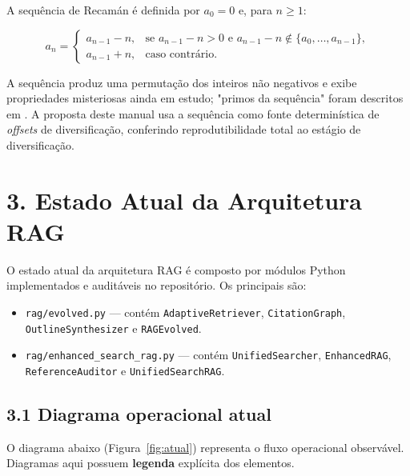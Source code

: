 \documentclass[
	article,
	11pt,
	oneside,
	a4paper,
	english,
	brazil,
	sumario=tradicional
	]{abntex2}
\begin{document}
A sequência de Recamán é definida por $a_0 = 0$ e, para $n \geq 1$:

\begin{equation}
\label{eq:recaman}
a_n = \begin{cases}
a_{n-1} - n, & \text{se } a_{n-1} - n > 0 \text{ e } a_{n-1} - n \notin \{a_0,\dots,a_{n-1}\},\\
a_{n-1} + n, & \text{caso contrário}.
\end{cases}
\end{equation}

A sequência produz uma permutação dos inteiros não negativos e exibe propriedades
misteriosas ainda em estudo; "primos da sequência" foram descritos em
\cite{Alekseyev2022RecamanCousins}. A proposta deste manual usa a sequência como
fonte determinística de \emph{offsets} de diversificação, conferindo
reprodutibilidade total ao estágio de diversificação.

\section*{3. Estado Atual da Arquitetura RAG}

O estado atual da arquitetura RAG é composto por módulos Python implementados e
auditáveis no repositório. Os principais são:

\begin{itemize}
  \item \texttt{rag/evolved.py} --- contém \texttt{AdaptiveRetriever},
        \texttt{CitationGraph}, \texttt{OutlineSynthesizer} e \texttt{RAGEvolved}.
  \item \texttt{rag/enhanced\_search\_rag.py} --- contém \texttt{UnifiedSearcher},
        \texttt{EnhancedRAG}, \texttt{ReferenceAuditor} e \texttt{UnifiedSearchRAG}.
\end{itemize}

\subsection*{3.1 Diagrama operacional atual}

O diagrama abaixo (Figura~\ref{fig:atual}) representa o fluxo operacional
observável. Diagramas aqui possuem \textbf{legenda} explícita dos elementos.
\end{document}
